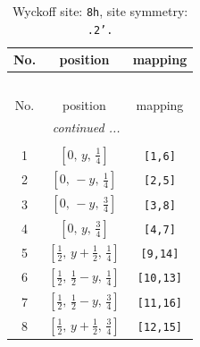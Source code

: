 \documentclass[fleqn,8pt]{jsarticle}
\begin{document}
\begin{longtable}{ccc}
\caption{Wyckoff site: {\tt 8h}, site symmetry: {\tt .2'.}}
 \\
 \hline \hline
No. & position & mapping \\ \hline \endfirsthead

\multicolumn{2}{l}{\tablename\ \thetable{}} \\
 \hline \hline
No. & position & mapping \\ \hline \endhead

 \hline \hline
\multicolumn{2}{r}{\footnotesize\it continued ...} \\ \endfoot

 \hline \hline
\multicolumn{2}{r}{} \\ \endlastfoot

1 & $\left[ 0,\, y,\, \frac{1}{4} \right]$ & {\tt [1,6]} \\ \hline
2 & $\left[ 0,\, - y,\, \frac{1}{4} \right]$ & {\tt [2,5]} \\ \hline
3 & $\left[ 0,\, - y,\, \frac{3}{4} \right]$ & {\tt [3,8]} \\ \hline
4 & $\left[ 0,\, y,\, \frac{3}{4} \right]$ & {\tt [4,7]} \\ \hline
5 & $\left[ \frac{1}{2},\, y + \frac{1}{2},\, \frac{1}{4} \right]$ & {\tt [9,14]} \\ \hline
6 & $\left[ \frac{1}{2},\, \frac{1}{2} - y,\, \frac{1}{4} \right]$ & {\tt [10,13]} \\ \hline
7 & $\left[ \frac{1}{2},\, \frac{1}{2} - y,\, \frac{3}{4} \right]$ & {\tt [11,16]} \\ \hline
8 & $\left[ \frac{1}{2},\, y + \frac{1}{2},\, \frac{3}{4} \right]$ & {\tt [12,15]} \\
\end{longtable}
\renewcommand{\arraystretch}{1.2}
\end{document}
